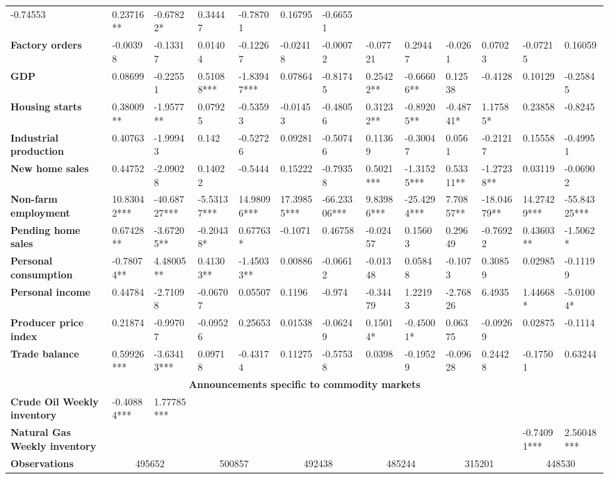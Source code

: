 \begin{sidewaystable}
{\begin{tabular}{@{}lllllllllllll@{}}
-0.74553 & 0.23716** & -0.67822* & 0.34447 & -0.78701 & 0.16795 & -0.66551 \\ \textbf{Factory orders}& -0.00398 & -0.13317 & 0.01404 & -0.12267 & -0.02418 & -0.00072 & -0.07721 & 0.29447 & -0.0261 & 0.07023 & -0.07215 & 0.16059 \\ \textbf{GDP}& 0.08699 & -0.22551 & 0.51088*** & -1.83947*** & 0.07864 & -0.81745 & 0.25422** & -0.66606** & 0.12538 & -0.4128 & 0.10129 & -0.25845 \\ \textbf{Housing starts}& 0.38009** & -1.9577** & 0.07925 & -0.53593 & -0.01453 & -0.48056 & 0.31232** & -0.89205** & -0.48741* & 1.17585* & 0.23858 & -0.8245 \\ \textbf{Industrial production}& 0.40763 & -1.99943 & 0.142 & -0.52726 & 0.09281 & -0.50746 & 0.11369 & -0.30047 & 0.0561 & -0.21217 & 0.15558 & -0.49951 \\ \textbf{New home sales}& 0.44752 & -2.09028 & 0.14022 & -0.5444 & 0.15222 & -0.79358 & 0.5021*** & -1.31525*** & 0.53311** & -1.27238** & 0.03119 & -0.06902 \\ \textbf{Non-farm employment}& 10.83042*** & -40.68727*** & -5.53137*** & 14.98096*** & 17.39855*** & -66.23306*** & 9.83986*** & -25.4294*** & 7.70857** & -18.04679** & 14.27429*** & -55.84325*** \\ \textbf{Pending home sales}& 0.67428** & -3.67205** & -0.20438* & 0.67763* & -0.1071 & 0.46758 & -0.02457 & 0.15603 & 0.29649 & -0.76922 & 0.43603** & -1.5062* \\ \textbf{Personal consumption}& -0.78074** & 4.48005** & 0.41303** & -1.45033** & 0.00886 & -0.06612 & -0.01348 & 0.05848 & -0.1073 & 0.30859 & 0.02985 & -0.11199 \\ \textbf{Personal income}& 0.44784 & -2.71098 & -0.06707 & 0.05507 & 0.1196 & -0.974 & -0.34479 & 1.22193 & -2.76826 & 6.4935 & 1.44668* & -5.01004* \\ \textbf{Producer price index}& 0.21874 & -0.99707 & -0.09526 & 0.25653 & 0.01538 & -0.06249 & 0.15014* & -0.45001* & 0.06375 & -0.09269 & 0.02875 & -0.1114 \\ \textbf{Trade balance}& 0.59926*** & -3.63413*** & 0.09718 & -0.43174 & 0.11275 & -0.57538 & 0.0398 & -0.19529 & -0.09628 & 0.24428 & -0.17501 & 0.63244 \\  \midrule \multicolumn{13}{c}{\textbf{Announcements specific to commodity markets}} \\ \midrule \textbf{Crude Oil Weekly inventory}& -0.40884*** & 1.77785*** &  &  &  &  &  &  &  &  &  &  \\ \textbf{Natural Gas Weekly inventory}&  &  &  &  &  &  &  &  &  &  & -0.74091*** & 2.56048*** \\  \midrule \textbf{Observations}             &\multicolumn{2}{c}{ 495652 }                                                 & \multicolumn{2}{c}{ 500857 }                                                 & \multicolumn{2}{c}{ 492438 }                                                 & \multicolumn{2}{c}{ 485244 }                                                 & \multicolumn{2}{c}{ 315201 }                                                   & \multicolumn{2}{c}{ 448530 }                   
\end{tabular}}
\end{sidewaystable}

